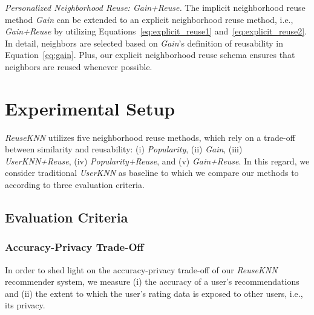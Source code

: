 \documentclass[manuscript,review,anonymous]{acmart}
\newcommand{\dk}[1]{
        \textcolor{blue}{DK: #1}}
\newcommand{\pmu}[1]{
        \textcolor{orange}{PM: #1}}
\begin{document}
\vspace{2mm} \noindent \emph{Personalized Neighborhood Reuse: Gain+Reuse.} The implicit neighborhood reuse method \emph{Gain} can be extended to an explicit neighborhood reuse method, i.e., \emph{Gain+Reuse} by utilizing Equations~\ref{eq:explicit_reuse1} and~\ref{eq:explicit_reuse2}.
In detail, neighbors are selected based on \emph{Gain}'s definition of reusability in Equation~\ref{eq:gain}.
Plus, our explicit neighborhood reuse schema ensures that neighbors are reused whenever possible.

\section{Experimental Setup}
\emph{ReuseKNN} utilizes five neighborhood reuse methods, which rely on a trade-off between similarity and reusability: %
(i) \emph{Popularity}, (ii) \emph{Gain}, (iii) \emph{UserKNN+Reuse}, (iv) \emph{Popularity+Reuse}, and (v) \emph{Gain+Reuse}.
In this regard, we consider traditional \emph{UserKNN} as baseline to which we compare our methods to according to three evaluation criteria.

\subsection{Evaluation Criteria}
\subsubsection{Accuracy-Privacy Trade-Off}
In order to shed light on the accuracy-privacy trade-off of our \emph{ReuseKNN} recommender system, we measure (i) the accuracy of a user's recommendations and (ii) the extent to which the user's rating data is exposed to other users, i.e., its privacy.
\end{document}
